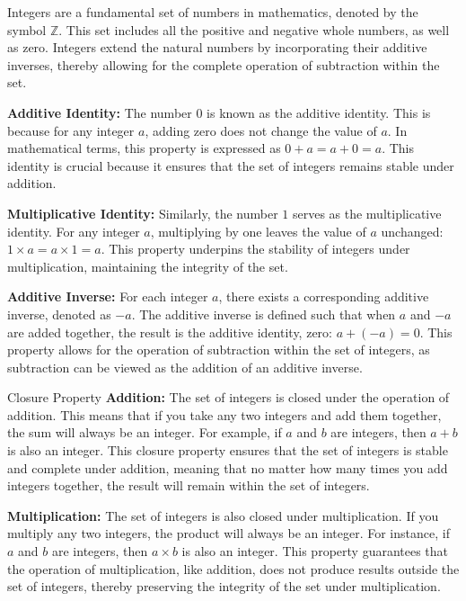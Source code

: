Integers are a fundamental set of numbers in mathematics, denoted by the symbol $\mathbb{Z}$. This set includes all the positive and negative whole numbers, as well as zero. Integers extend the natural numbers by incorporating their additive inverses, thereby allowing for the complete operation of subtraction within the set.

\textbf{Additive Identity:} The number \(0\) is known as the additive identity. This is because for any integer \(a\), adding zero does not change the value of \(a\). In mathematical terms, this property is expressed as \(0 + a = a + 0 = a\). This identity is crucial because it ensures that the set of integers remains stable under addition.
    
 \textbf{Multiplicative Identity:} Similarly, the number \(1\) serves as the multiplicative identity. For any integer \(a\), multiplying by one leaves the value of \(a\) unchanged: \(1 \times a = a \times 1 = a\). This property underpins the stability of integers under multiplication, maintaining the integrity of the set.
    
\textbf{Additive Inverse:} For each integer \(a\), there exists a corresponding additive inverse, denoted as \(-a\). The additive inverse is defined such that when \(a\) and \(-a\) are added together, the result is the additive identity, zero: \(a + (-a) = 0\). This property allows for the operation of subtraction within the set of integers, as subtraction can be viewed as the addition of an additive inverse.

\begin{custombox}{Closure Property}
    \textbf{Addition:} The set of integers is closed under the operation of addition. This means that if you take any two integers and add them together, the sum will always be an integer. For example, if \(a\) and \(b\) are integers, then \(a + b\) is also an integer. This closure property ensures that the set of integers is stable and complete under addition, meaning that no matter how many times you add integers together, the result will remain within the set of integers.

\textbf{Multiplication:} The set of integers is also closed under multiplication. If you multiply any two integers, the product will always be an integer. For instance, if \(a\) and \(b\) are integers, then \(a \times b\) is also an integer. This property guarantees that the operation of multiplication, like addition, does not produce results outside the set of integers, thereby preserving the integrity of the set under multiplication.

\end{custombox}

